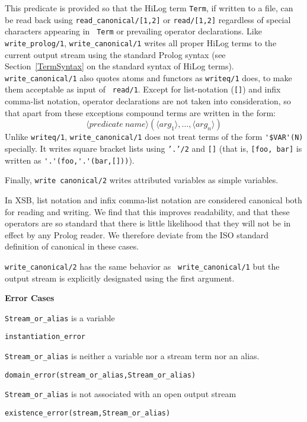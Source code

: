 \begin{description}
%
This predicate is provided so that the HiLog term {\tt Term}, if
written to a file, can be read back using {\tt read\_canonical/[1,2]}
or {\tt read/[1,2]} regardless of special characters appearing in {\tt
  Term} or prevailing operator declarations. Like {\tt
  write\_prolog/1}, {\tt write\_canonical/1} writes all proper HiLog
terms to the current output stream using the standard Prolog syntax
(see Section~\ref{TermSyntax} on the standard syntax of HiLog
terms). {\tt write\_canonical/1} also quotes atoms and functors as
{\tt writeq/1} does, to make them acceptable as input of {\tt
  read/1}\@.  Except for list-notation ({\tt []}) and infix comma-list
notation, operator declarations are not taken into consideration, so
that apart from these exceptions compound terms are written in the
form:
%
		\[ \langle predicate\ name \rangle
			(\langle arg_1 \rangle, \ldots,
			 \langle arg_n \rangle) \]
%
Unlike {\tt writeq/1}, {\tt write\_canonical/1} does not treat terms
of the form \verb|'$VAR'(N)| specially. It writes square bracket lists  %
using {\tt '.'/2} and {\tt []} (that is, {\tt [foo, bar]} is written
as \verb|'.'(foo,'.'(bar,[]))|).

Finally, {\tt write canonical/2} writes attributed variables as simple
variables.

\compatibility
%
In XSB, list notation and infix comma-list notation are considered
canonical both for reading and writing.  We find that this improves
readability, and that these operators are so standard that there is
little likelihood that they will not be in effect by any Prolog
reader.  We therefore deviate from the ISO standard definition of
canonical in these cases.

%
{\tt write\_canonical/2} has the same behavior as {\tt
write\_canonical/1} but the output stream is explicitly designated
using the first argument.

{\bf Error Cases} 
\bi
\item 	{\tt Stream\_or\_alias} is a variable
\bi
\item {\tt instantiation\_error}
\ei
\item 	{\tt Stream\_or\_alias} is neither a variable nor a stream term nor an alias.
\bi
\item 	{\tt domain\_error(stream\_or\_alias,Stream\_or\_alias)}
\ei
\item 	{\tt Stream\_or\_alias} is not associated with an open output stream
\bi
\item 	{\tt existence\_error(stream,Stream\_or\_alias)}
\ei
\ei


\end{description}
